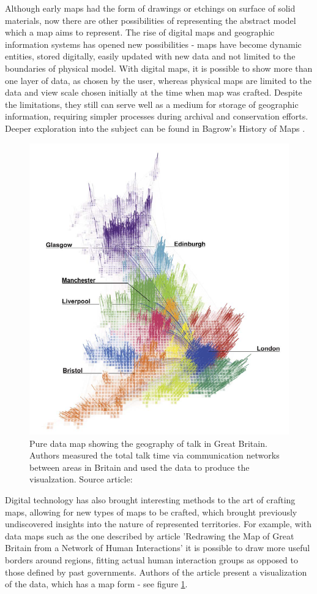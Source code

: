 \documentclass[12pt]{report}
\begin{document}
Although early maps had the form of drawings or etchings on surface of solid materials, now there are other possibilities of representing the abstract model which a map aims to represent. The rise of digital maps and geographic information systems has opened new possibilities - maps have become dynamic entities, stored digitally, easily updated with new data and not limited to the boundaries of physical model. With digital maps, it is possible to show more than one layer of data, as chosen by the user, whereas physical maps are limited to the data and view scale chosen initially at the time when map was crafted. Despite the limitations, they still can serve well as a medium for storage of geographic information, requiring simpler processes during archival and conservation efforts. Deeper exploration into the subject can be found in Bagrow's History of Maps \autocite{bagrow2017history}.

\begin{figure}[h!]
	\centering
	\includegraphics[width=0.6\linewidth]{images/journal_netw_talk_map}
	\caption{Pure data map showing the geography of talk in Great Britain. Authors measured the total talk time via communication networks between areas in Britain and used the data to produce the visualzation. Source article: \autocite{10.1371/journal.pone.0014248}}
	\label{fig:journalnetwtalkmap}
\end{figure}


Digital technology has also brought interesting methods to the art of crafting maps, allowing for new types of maps to be crafted, which brought previously undiscovered insights into the nature of represented territories. For example, with data maps such as the one described by article 'Redrawing the Map of Great Britain from a Network of Human Interactions' \autocite{10.1371/journal.pone.0014248} it is possible to draw more useful borders around regions, fitting actual human interaction groups as opposed to those defined by past governments. Authors of the article present a visualization of the data, which has a map form - see figure \ref{fig:journalnetwtalkmap}.
\end{document}
